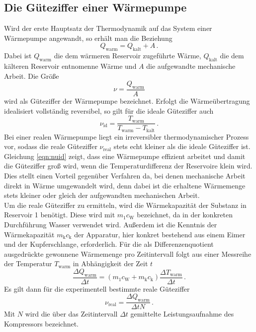 \subsection{Die Güteziffer einer Wärmepumpe}
Wird der erste Hauptsatz der Thermodynamik auf das System einer Wärmepumpe angewandt,
so erhält man die Beziehung
\begin{equation}
  Q_\text{warm} = Q_\text{kalt} + A\,.
  \label{eqn:waermebilanz}
\end{equation}
Dabei ist $Q_\text{warm}$ die dem wärmeren Reservoir zugeführte Wärme,
$Q_\text{kalt}$ die dem kälteren Reservoir entnomenne Wärme und $A$ die aufgewandte
mechanische Arbeit.
Die Größe
\begin{equation}
  \nu = \frac{Q_\text{warm}}{A}
  \label{eqn:defnu}
\end{equation}
wird als Güteziffer der Wärmepumpe bezeichnet.
Erfolgt die Wärmeübertragung idealisiert vollständig reversibel, so gilt für die ideale
Güteziffer auch
\begin{equation}
  \nu_\text{id} = \frac{T_\text{warm}}{T_\text{warm} - T_\text{kalt}}\,.
  \label{eqn:nuid}
\end{equation}
Bei einer realen Wärmepumpe liegt ein irreversibler thermodynamischer Prozess vor,
sodass die reale Güteziffer $\nu_\text{real}$ stets echt kleiner als die ideale
Güteziffer ist.
Gleichung \eqref{eqn:nuid} zeigt, dass eine Wärmepumpe effizient arbeitet und damit
die Güteziffer groß wird, wenn die Temperaturdifferenz der Reservoire
klein wird. Dies stellt einen Vorteil gegenüber Verfahren da, bei denen mechanische Arbeit
direkt in Wärme umgewandelt wird, denn dabei ist die erhaltene Wärmemenge stets kleiner
oder gleich der aufgewandten mechanischen Arbeit.\\
Um die reale Güteziffer zu ermitteln, wird die Wärmekapazität der Substanz
in Reservoir 1 benötigt. Diese wird mit $m_1 c_\text{W}$ bezeichnet, da in der konkreten Durchführung
Wasser verwendet wird. Außerdem ist die Kenntnis der Wärmekapazität $m_\text{k} c_\text{k}$
der Apparatur, hier konkret bestehend aus einem Eimer und der Kupferschlange, erforderlich.
Für die als Differenzenquotient ausgedrückte gewonnene Wärmemenge pro Zeitintervall
folgt aus einer Messreihe der Temperatur $T_\text{warm}$ in Abhängigkeit der Zeit $t$
\begin{equation}
  \frac{\Delta Q_\text{warm}}{\Delta t} = (m_1 c_\text{W} + m_\text{k} c_\text{k}) \frac{\Delta T_\text{warm}}{\Delta t}\,.
  \label{eqn:waermewarmprozeit}
\end{equation}
Es gilt dann für die experimentell bestimmte reale Güteziffer
\begin{equation}
  \nu_\text{real} = \frac{\Delta Q_\text{warm}}{\Delta t N}\,.
  \label{eqn:nureal}
\end{equation}
Mit $N$ wird die über das Zeitintervall $\Delta t$ gemittelte Leistungsaufnahme des
Kompressors bezeichnet.
